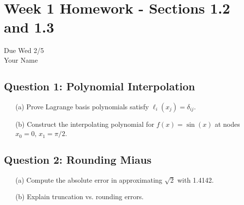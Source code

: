 \section*{Week 1 Homework - Sections 1.2 and 1.3}
\begin{center}
  Due Wed 2/5 \\
  Your Name
\end{center}

\subsection*{Question 1: Polynomial Interpolation}
\begin{enumerate}
  \item[(a)] Prove Lagrange basis polynomials satisfy $\ell_i(x_j) = \delta_{ij}$.
  
  \item[(b)] Construct the interpolating polynomial for $f(x) = \sin(x)$ at nodes $x_0=0$, $x_1=\pi/2$.
\end{enumerate}

\subsection*{Question 2: Rounding Miaus}
\begin{enumerate}
  \item[(a)] Compute the absolute error in approximating $\sqrt{2}$ with 1.4142.
  
  \item[(b)] Explain truncation vs. rounding errors.
\end{enumerate}